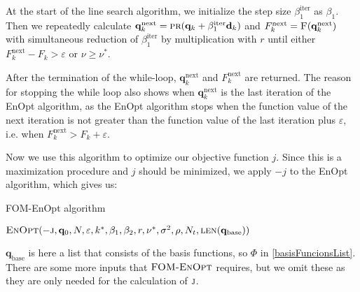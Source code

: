At the start of the line search algorithm, we initialize the step size $\beta^\mathrm{iter}_1$ as $\beta_1$. Then we repeatedly calculate $\mathbf{q}^\mathrm{next}_k = \Call{pr}{\mathbf{q}_k+\beta^\mathrm{iter}_1\mathbf{d}_k}$ and $F^\mathrm{next}_k = \Call{F}{\mathbf{q}^\mathrm{next}_k}$ with simultaneous reduction of $\beta^\mathrm{iter}_1$ by multiplication with $r$ until either $F^\mathrm{next}_k-F_k>\varepsilon$ or $\nu\geq\nu^*$.

After the termination of the while-loop, $\mathbf{q}^\mathrm{next}_k$ and $F^\mathrm{next}_k$ are returned. The reason for stopping the while loop also shows when $\mathbf{q}^\mathrm{next}_k$ is the last iteration of the EnOpt algorithm, as the EnOpt algorithm stops when the function value of the next iteration is not greater than the function value of the last iteration plus $\varepsilon$, i.e. when $F^\mathrm{next}_k>F_k+\varepsilon$.

Now we use this algorithm to optimize our objective function $j$. Since this is a maximization procedure and $j$ should be minimized, we apply $-j$ to the EnOpt algorithm, which gives us:

\begin{algorithm}[H]%
\caption{\label{FOM-EnOpt}FOM-EnOpt algorithm}
\begin{algorithmic}[1]
\State \Return $\Call{EnOpt}{-\textproc{j},\mathbf{q}_0,N,\varepsilon,k^*,\beta_1,\beta_2,r,\nu^*,\sigma^2,\rho, N_t, \protect\Call{len}{\mathbf{q}_\mathrm{base}}}$
\EndFunction
\end{algorithmic}
\end{algorithm}

$\mathbf{q}_\mathrm{base}$ is here a list that consists of the basis functions, so $\Phi$ in \eqref{basisFuncionsList}. There are some more inputs that $\textproc{FOM-EnOpt}$ requires, but we omit these as they are only needed for the calculation of $\textproc{j}$.